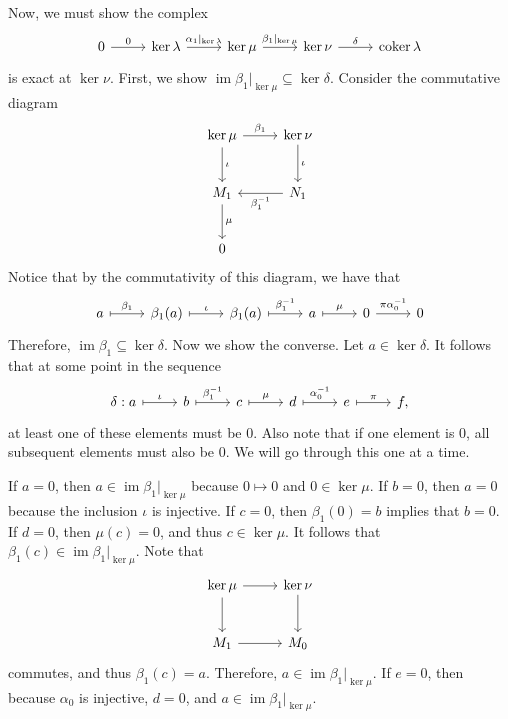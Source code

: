 \documentclass[11pt, letterpaper]{article}
\DeclareMathOperator{\im}{im}
\DeclareMathOperator{\coker}{coker}
\renewenvironment{proof}[1][]{\begin{replacementproof2}}{\end{replacementproof2}}
\begin{document}
\begin{proof}
Now, we must show the complex
\[\begin{tikzcd}[row sep = 2.5em, column sep = 2.5em]
	0\arrow[r, "0"]&\ker \lambda \arrow[r, "\alpha_1|_{\ker \lambda }"]&\ker \mu \arrow[r, "\beta_1|_{\ker \mu }"]&\ker \nu \arrow[r, "\delta "]&\coker \lambda 
\end{tikzcd}\]
is exact at $\ker \nu $. First, we show $\im \beta_1|_{\ker \mu}\subseteq \ker \delta $. Consider the commutative diagram
\[\begin{tikzcd}[row sep = 2.5em, column sep = 2.5em]
	\ker \mu \arrow[r, "\beta_1"]\arrow[d, "\iota "]&\ker \nu \arrow[d, "\iota "]\\
	M_1\arrow[d, "\mu "]&N_1\arrow[l, "\beta_1^{-1} "]\\
	0
\end{tikzcd}\]
Notice that by the commutativity of this diagram, we have that
\[\begin{tikzcd}[row sep = 2.5em, column sep = 2.5em]
	a\arrow[r, mapsto, "\beta_1"]&\beta_1(a)\arrow[r, mapsto, "\iota "]&\beta_1(a)\arrow[r, mapsto, "\beta_1^{-1}"]&a\arrow[r, mapsto, "\mu "]&0\arrow[r, "\pi \alpha_0^{-1}"]&0
\end{tikzcd}\]
Therefore, $\im \beta_1\subseteq \ker \delta $. Now we show the converse. Let $a\in \ker \delta $. It follows that at some point in the sequence
\[\begin{tikzcd}[row sep = 2.5em, column sep = 2.5em]
	\delta : a\arrow[r, mapsto, "\iota "]&b\arrow[r, mapsto, "\beta_1^{-1} "]&c\arrow[r, mapsto, "\mu "]&d\arrow[r, mapsto, "\alpha_0^{-1} "]&e\arrow[r, mapsto, "\pi "]&f,
\end{tikzcd}\]
at least one of these elements must be 0. Also note that if one element is 0, all subsequent elements must also be 0. We will go through this one at a time.

If $a=0$, then $a\in \im \beta_1|_{\ker \mu }$ because $0\mapsto 0$ and $0\in \ker \mu $. If $b=0$, then $a=0$ because the inclusion $\iota $ is injective. If $c=0$, then $\beta_1(0)=b$ implies that $b=0$. If $d=0$, then $\mu (c)=0$, and thus $c\in \ker \mu $. It follows that $\beta_1(c)\in \im\beta_1|_{\ker \mu }$. Note that
\[\begin{tikzcd}[row sep = 2.5em, column sep = 2.5em]
	\ker \mu \arrow[r]\arrow[d]&\ker \nu \arrow[d]\\
	M_1\arrow[r]&M_0
\end{tikzcd}\]
commutes, and thus $\beta_1(c)=a$. Therefore, $a\in \im \beta_1|_{\ker \mu }$. If $e=0$, then because $\alpha_0$ is injective, $d=0$, and $a\in \im \beta_1|_{\ker \mu }$.


\end{proof}
\end{document}
